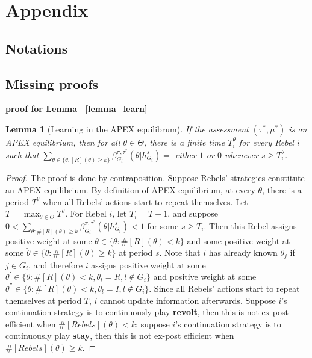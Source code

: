 \documentclass[12pt,letter]{article}
\newtheorem*{lemma*}{Lemma}
\theoremstyle{definition}
\theoremstyle{remark}
\theoremstyle{claim}
\begin{document}


\appendix
\section{Appendix}
\subsection{Notations}



\subsection{Missing proofs}
\noindent\textbf{proof for Lemma ~\ref{lemma_learn}}
\begin{lemma*}[Learning in the APEX equilibrum]
If the assessment $(\tau^*,\mu^{*})$ is an APEX equilibrium, then for all $\theta\in \Theta$, there is a finite time $T^{\theta}_i$ for every Rebel $i$ such that $\sum_{\theta\in\{\theta:[R](\theta)\geq k\}}\beta^{\pi,\tau^*}_{G_i}(\theta|h^{s}_{G_i})=$ either $1$ or $0$
whenever $s\geq T^{\theta}_i$.
\end{lemma*}
\begin{proof}
The proof is done by contraposition. Suppose Rebels' strategies constitute an APEX equilibrium. By definition of APEX equilibrium, at every $\theta$, there is a period $T^{\theta}$ when all Rebels' actions start to repeat themselves. Let $T=\max_{\theta\in \Theta}{T^{\theta}}$. For Rebel $i$, let $T_i=T+1$, and suppose $0<\sum_{\theta:\#[R](\theta)\geq k}\beta^{\pi,\tau^*}_{G_i}(\theta|h^{s}_{G_i})<1$ for some $s\geq T_i$. Then this Rebel assigns positive weight at some $\dot{\theta}\in \{\theta:\#[R](\theta)< k\}$ and some positive weight at some $\ddot{\theta}\in \{\theta:\#[R](\theta)\geq k\}$ at period $s$. Note that $i$ has already known $\theta_j$ if $j\in G_i$, and therefore $i$ assigns positive weight at some $\theta^{'}\in \{\theta:\#[R](\theta)< k, \theta_l=R, l\notin G_i\}$ and positive weight at some $\theta^{''}\in \{\theta:\#[R](\theta)< k, \theta_l=I, l\notin G_i\}$. Since all Rebels' actions start to repeat themselves at period $T$, $i$ cannot update information afterwards. Suppose $i$'s continuation strategy is to continuously play \textbf{revolt}, then this is not ex-post efficient when $\#[Rebels](\theta)< k$; suppose $i$'s continuation strategy is to continuously play \textbf{stay}, then this is not ex-post efficient when $\#[Rebels](\theta)\geq k$.
\end{proof}
\end{document}
